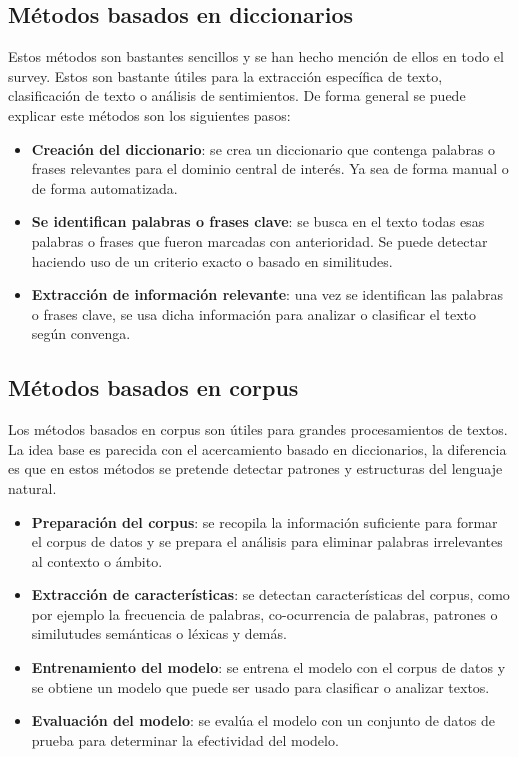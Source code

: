 \documentclass[12pt, conference]{IEEEtran}
\begin{document}
\subsection{Métodos basados en diccionarios}
Estos métodos son bastantes sencillos y se han hecho mención de ellos en todo el survey. Estos son bastante útiles para la extracción específica de texto, clasificación de texto o análisis de sentimientos. De forma general se puede explicar este métodos son los siguientes pasos:

\begin{itemize}
  \item \textbf{Creación del diccionario}: se crea un diccionario que contenga palabras o frases relevantes para el dominio central de interés. Ya sea de forma manual o de forma automatizada.
  \item \textbf{Se identifican palabras o frases clave}: se busca en el texto todas esas palabras o frases que fueron marcadas con anterioridad. Se puede detectar haciendo uso de un criterio exacto o basado en similitudes.
  \item \textbf{Extracción de información relevante}: una vez se identifican las palabras o frases clave, se usa dicha información para analizar o clasificar el texto según convenga.
\end{itemize}

\subsection{Métodos basados en corpus}

Los métodos basados en corpus son útiles para grandes procesamientos de textos. La idea base es parecida con el acercamiento basado en diccionarios, la diferencia es que en estos métodos se pretende detectar patrones y estructuras del lenguaje natural.

\begin{itemize}
  \item \textbf{Preparación del corpus}: se recopila la información suficiente para formar el corpus de datos y se prepara el análisis para eliminar palabras irrelevantes al contexto o ámbito.
  \item \textbf{Extracción de características}: se detectan características del corpus, como por ejemplo la frecuencia de palabras, co-ocurrencia de palabras, patrones o similutudes semánticas o léxicas y demás.
  \item \textbf{Entrenamiento del modelo}: se entrena el modelo con el corpus de datos y se obtiene un modelo que puede ser usado para clasificar o analizar textos.
  \item \textbf{Evaluación del modelo}: se evalúa el modelo con un conjunto de datos de prueba para determinar la efectividad del modelo.
\end {itemize}
\end{document}
